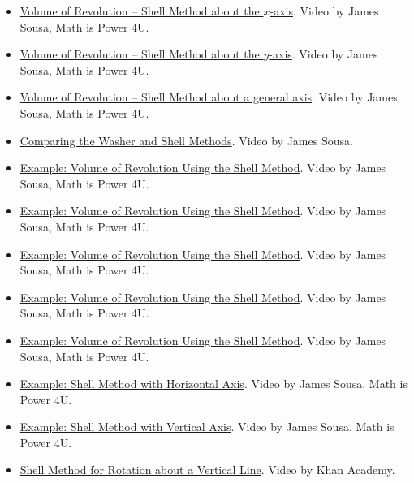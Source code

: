 \begin{itemize}

\item \href{https://youtu.be/pCMkHkprN0I}{Volume of Revolution – Shell Method about the $x$-axis}.  
Video by James Sousa, Math is Power 4U.

\item \href{https://youtu.be/3B2YQbEzshg}{Volume of Revolution – Shell Method about the $y$-axis}.  
Video by James Sousa, Math is Power 4U.

\item \href{https://youtu.be/lp3_rmjbxZ8}{Volume of Revolution – Shell Method about a general axis}.  
Video by James Sousa, Math is Power 4U.

\item \href{https://youtu.be/ZyFaaKhNPXo}{Comparing the Washer and Shell Methods}.  
Video by James Sousa.

\item \href{https://www.youtube.com/watch?v=DHCWM-Pg_Yw}{Example: Volume of Revolution Using the Shell Method}.  
Video by James Sousa, Math is Power 4U.

\item \href{https://www.youtube.com/watch?v=aW_3JoRHsPU}{Example: Volume of Revolution Using the Shell Method}.  
Video by James Sousa, Math is Power 4U.

\item \href{https://www.youtube.com/watch?v=m2VopSFCzZ4}{Example: Volume of Revolution Using the Shell Method}.  
Video by James Sousa, Math is Power 4U.

\item \href{https://www.youtube.com/watch?v=MdbsmztIAkA}{Example: Volume of Revolution Using the Shell Method}.  
Video by James Sousa, Math is Power 4U.

\item \href{https://www.youtube.com/watch?v=FANXpoGp-hQ}{Example: Volume of Revolution Using the Shell Method}.  
Video by James Sousa, Math is Power 4U.

\item \href{https://www.youtube.com/watch?v=SIHrWcLsNYs}{Example: Shell Method with Horizontal Axis}.  
Video by James Sousa, Math is Power 4U.

\item \href{https://www.youtube.com/watch?v=fAKmfe_5QWw}{Example: Shell Method with Vertical Axis}.  
Video by James Sousa, Math is Power 4U.

\item \href{https://www.youtube.com/watch?v=6Ozz3J-LRrY}{Shell Method for Rotation about a Vertical Line}.  
Video by Khan Academy.


\end{itemize}

